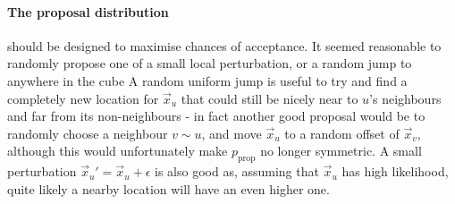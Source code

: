 

\paragraph{The proposal distribution} should be designed to maximise chances of acceptance. It seemed reasonable to randomly propose one of a small local perturbation, or a random jump to anywhere in the cube
A random uniform jump is useful to try and find a completely new location for $\vec{x}_u$ that could still be nicely near to $u$'s neighbours and far from its non-neighbours - in fact another good proposal would be to randomly choose a neighbour $v \sim u$, and move $\vec{x}_u$ to a random offset of $\vec{x}_v$, although this would unfortunately make $p_{\mathrm{prop}}$ no longer symmetric.
A small perturbation $\vec{x}_u' = \vec{x}_u + \epsilon$ is also good as, assuming that $\vec{x}_u$ has high likelihood, quite likely a nearby location will have an even higher one.


